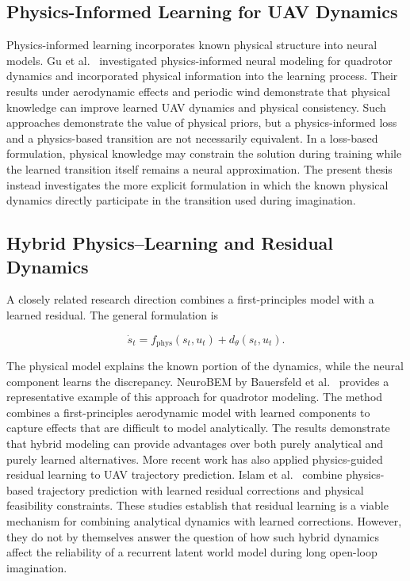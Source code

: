 \documentclass[conference]{IEEEtran}
\begin{document}
\subsection{Physics-Informed Learning for UAV Dynamics}

Physics-informed learning incorporates known physical structure into
neural models. Gu et al.~\cite{gu2024physics} investigated
physics-informed neural modeling for quadrotor dynamics and incorporated
physical information into the learning process. Their results under
aerodynamic effects and periodic wind demonstrate that physical
knowledge can improve learned UAV dynamics and physical consistency. Such approaches demonstrate the value of physical priors, but a
physics-informed loss and a physics-based transition are not
necessarily equivalent. In a loss-based formulation, physical
knowledge may constrain the solution during training while the learned
transition itself remains a neural approximation. The present thesis
instead investigates the more explicit formulation in which the known
physical dynamics directly participate in the transition used during
imagination.


\subsection{Hybrid Physics--Learning and Residual Dynamics}

A closely related research direction combines a first-principles model
with a learned residual. The general formulation is

\begin{equation}
\dot{s}_t
=
f_{\mathrm{phys}}(s_t,u_t)
+
d_{\theta}(s_t,u_t).
\end{equation}

The physical model explains the known portion of the dynamics, while
the neural component learns the discrepancy. NeuroBEM by Bauersfeld et al.~\cite{bauersfeld2021neurobem} provides a
representative example of this approach for quadrotor modeling. The
method combines a first-principles aerodynamic model with learned
components to capture effects that are difficult to model analytically.
The results demonstrate that hybrid modeling can provide advantages
over both purely analytical and purely learned alternatives. More recent work has also applied physics-guided residual learning to
UAV trajectory prediction. Islam et al.~\cite{islam2026physics}
combine physics-based trajectory prediction with learned residual
corrections and physical feasibility constraints. These studies establish that residual learning is a viable mechanism
for combining analytical dynamics with learned corrections. However,
they do not by themselves answer the question of how such hybrid
dynamics affect the reliability of a recurrent latent world model
during long open-loop imagination.
\end{document}

